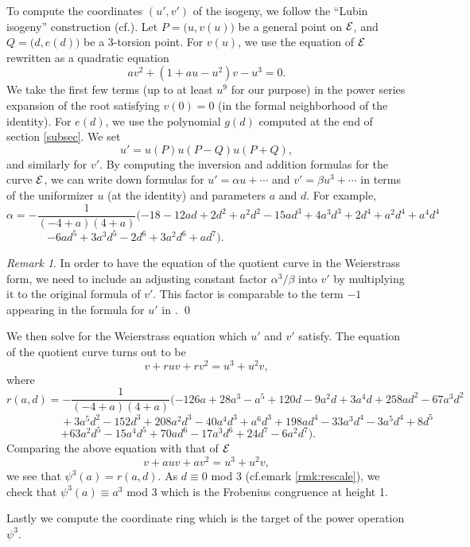 \documentclass{gtpart}
\theoremstyle{definition}
\theoremstyle{remark}
\newtheorem{rmk}[thm]{Remark}
\newcommand{\cff}[2]{cf.\thinspace{\cite[#1]{#2}}}
\begin{document}
To compute the coordinates $(u',v')$ of the isogeny, we follow the ``Lubin 
isogeny'' construction (\cff{proof of theorem 1.4}{lubin}).  Let 
$P = \big(u,v(u)\big)$ be a general point on $\cal E$, and 
$Q = \big(d,e(d)\big)$ be a 3-torsion point.  For $v(u)$, we use the equation 
of $\cal E$ rewritten as a quadratic equation 
\[
 a v^2 + (1 + a u - u^2) v - u^3 = 0.  
\]
We take the first few terms (up to at least $u^9$ for our purpose) in the 
power series expansion of the root satisfying $v(0)=0$ (in the formal 
neighborhood of the identity).  For $e(d)$, we use the polynomial $g(d)$ 
computed at the end of section \ref{subsec}.  We set 
\[
 u' = u(P) u(P-Q) u(P+Q), 
\]
and similarly for $v'$.  By computing the inversion and addition formulas for 
the curve $\cal E$, we can write down formulas for $u' = \alpha u + \cdots$ 
and $v' = \beta u^3 + \cdots$ in terms of the uniformizer $u$ (at the 
identity) and parameters $a$ and $d$.  For example, 
\[
 \alpha = -\frac{1}{(-4 + a) (4 + a)}(-18 - 12 a d + 2 d^2 + a^2 d^2 
 - 15 a d^3 + 4 a^3 d^3 + 2 d^4 + a^2 d^4 + a^4 d^4 
\]
\[
 - 6 a d^5 + 3 a^3 d^5 - 2 d^6 + 3 a^2 d^6 + a d^7).  
 ~~~~~~~~~~~~~~~~~~~~~~~~~~~~~~~~~~~~~~~~~~~~~~~~~~~~~~~~~~ 
\]
\begin{rmk}
 In order to have the equation of the quotient curve in the Weierstrass form, 
 we need to include an adjusting constant factor $\alpha^3 / \beta$ into $v'$ 
 by multiplying it to the original formula of $v'$.  This factor is comparable 
 to the term $-1$ appearing in the formula for $u'$ in 
 \cite[p.]{h2p2}.  \qed
\end{rmk}

We then solve for the Weierstrass equation which $u'$ and $v'$ satisfy.  The 
equation of the quotient curve turns out to be 
\[
 v + r u v + r v^2 = u^3 + u^2 v, 
\]
where 
\[
 r(a,d) = -\frac{1}{(-4 + a) (4 + a)}(-126 a + 28 a^3 - a^5 + 120 d - 9 a^2 d 
 + 3 a^4 d + 258 a d^2 - 67 a^3 d^2 
\]
\[
 ~~~~~~~~~~~~~~~~~~~~~~+ 3 a^5 d^2 - 152 d^3 + 208 a^2 d^3 - 40 a^4 d^3 + 
 a^6 d^3 + 198 a d^4 - 33 a^3 d^4 - 3 a^5 d^4 + 8 d^5 
\]
\[
 + 63 a^2 d^5 - 15 a^4 d^5 + 70 a d^6 - 17 a^3 d^6 + 24 d^7 - 6 a^2 d^7).  
 ~~~~~~~~~~~~~~~ 
\]
Comparing the above equation with that of $\cal E$ 
\[
 v + a u v + a v^2 = u^3 + u^2 v, 
\]
we see that $\psi^3(a) = r(a,d)$.  As $d \equiv 0$ mod 3 
(cf.emark \ref{rmk:rescale}), we check that 
$\psi^3(a) \equiv a^3$ mod 3 which is the Frobenius congruence at height 1.  

Lastly we compute the coordinate ring which is the target of the power 
operation $\psi^3$.  
\end{document}
